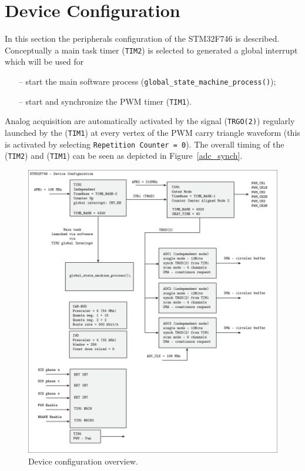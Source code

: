 \documentclass[11pt,a4paper,oneside]{book}
\numberwithin{equation}{section}
\theoremstyle{it}
\theoremstyle{definition}
\begin{document}
\section{Device Configuration}
In this section the peripherals configuration of the STM32F746 is described. Conceptually a main task timer ({\selectfont \verb+TIM2+}) is selected to generated a global interrupt which will be used for
	\begin{itemize}
	\item[--] start the main software process ({\selectfont \verb+global_state_machine_process()+});
	\item[--] start and synchronize the PWM timer ({\selectfont \verb+TIM1+}).		
\end{itemize}
Analog acquisition are automatically activated by the signal ({\selectfont \verb+TRGO(2)+}) regularly launched by the ({\selectfont \verb+TIM1+}) at every vertex of the PWM carry triangle waveform (this is activated by selecting {\selectfont \verb+Repetition Counter = 0+}).
The overall timing of the ({\selectfont \verb+TIM2+}) and ({\selectfont \verb+TIM1+}) can be seen as depicted in Figure~\ref{adc_synch}.
\begin{figure}[H]
	\centering
	\includegraphics[width= 475pt, angle = 0, 
	keepaspectratio]{figures/firmware_arch/device_config_1.eps}
	\captionsetup{width=0.5\textwidth, font=small}	
	\caption{Device configuration overview.}
	\label{device_config_1}
\end{figure}
\end{document}
